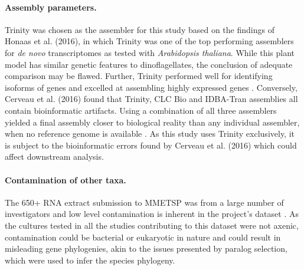 \documentclass[12pt]{article}
\begin{document}
\paragraph*{Assembly parameters.}
Trinity was chosen as the assembler for this study based on the findings of Honaas et al. (2016), in which Trinity was one of the top performing assemblers for \textit{de novo} transcriptomes as tested with \textit{Arabidopsis thaliana}. 
While this plant model has similar genetic features to dinoflagellates, the conclusion of adequate comparison may be flawed.
Further, Trinity performed well for identifying isoforms of genes and excelled at assembling highly expressed genes \cite{honaas2016selecting}.
Conversely, Cerveau et al. (2016) found that Trinity, CLC Bio and IDBA-Tran assemblies all contain bioinformatic artifacts. 
Using a combination of all three assemblers yielded a final assembly closer to biological reality than any individual assembler, when no reference genome is available \cite{cerveau2016combining}.
As this study uses Trinity exclusively, it is subject to the bioinformatic errors found by Cerveau et al. (2016) which could affect downstream analysis.
\paragraph*{Contamination of other taxa.} 
The 650+ RNA extract submission to MMETSP was from a large number of investigators and low level contamination is inherent in the project's dataset \cite{keeling2014marine}. 
As the cultures tested in all the studies contributing to this dataset were not axenic, contamination could be bacterial or eukaryotic in nature and could result in misleading gene phylogenies, akin to the issues presented by paralog selection, which were used to infer the species phylogeny.
\end{document}
